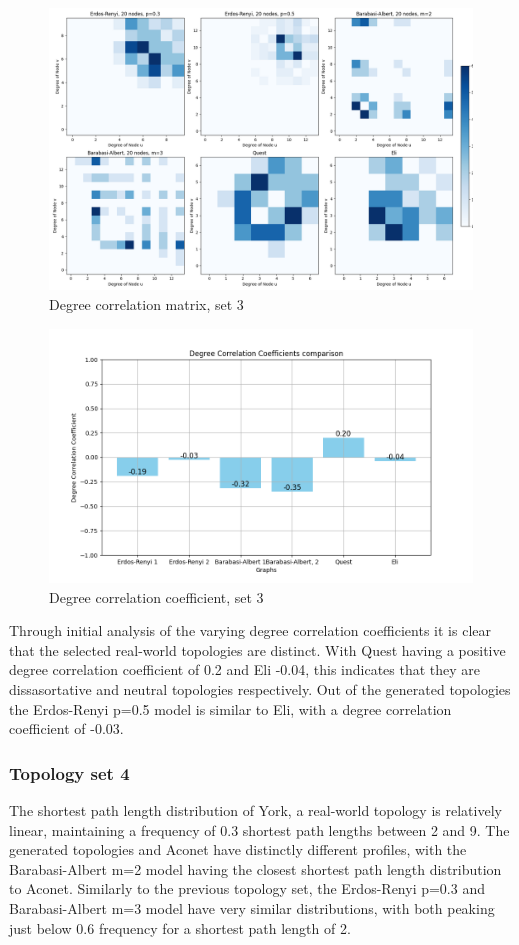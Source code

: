 \begin{figure}
    \centering
    \includegraphics[width=0.9\linewidth]{images/FINAL-TOPO-COMP/Degree-correlation-matrices/20-matrix.png}
    \caption{Degree correlation matrix, set 3}
    \label{fig:enter-label}
\end{figure}

\begin{figure}
    \centering
    \includegraphics[width=0.9\linewidth]{images/FINAL-TOPO-COMP/Degree-correlation-coeff/deg-coeff-20.png}
    \caption{Degree correlation coefficient, set 3}
    \label{fig:enter-label}
\end{figure}
Through initial analysis of the varying degree correlation coefficients it is clear that the selected real-world topologies are distinct. With Quest having a positive degree correlation coefficient of 0.2 and Eli -0.04, this indicates that they are dissasortative and neutral topologies respectively. Out of the generated topologies the Erdos-Renyi p=0.5 model is similar to Eli, with a degree correlation coefficient of -0.03. 

\subsubsection{Topology set 4}
The shortest path length distribution of York, a real-world topology is relatively linear, maintaining a frequency of 0.3 shortest path lengths between 2 and 9. The generated topologies and Aconet have distinctly different profiles, with the Barabasi-Albert m=2 model having the closest shortest path length distribution to Aconet. Similarly to the previous topology set, the Erdos-Renyi p=0.3 and Barabasi-Albert m=3 model have very similar distributions, with both peaking just below 0.6 frequency for a shortest path length of 2. 

